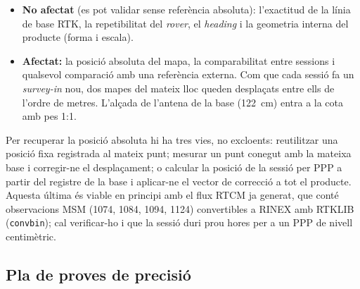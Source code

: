 \begin{itemize}
    \item \textbf{No afectat} (es pot validar sense referència absoluta): l'exactitud de la línia de base RTK, la repetibilitat del \emph{rover}, el \emph{heading} i la geometria interna del producte (forma i escala).
    \item \textbf{Afectat:} la posició absoluta del mapa, la comparabilitat entre sessions i qualsevol comparació amb una referència externa. Com que cada sessió fa un \emph{survey-in} nou, dos mapes del mateix lloc queden desplaçats entre ells de l'ordre de metres. L'alçada de l'antena de la base (122~cm) entra a la cota amb pes 1:1.
\end{itemize}

Per recuperar la posició absoluta hi ha tres vies, no excloents: reutilitzar una posició fixa registrada al mateix punt; mesurar un punt conegut amb la mateixa base i corregir-ne el desplaçament; o calcular la posició de la sessió per PPP a partir del registre de la base i aplicar-ne el vector de correcció a tot el producte. Aquesta última és viable en principi amb el flux RTCM ja generat, que conté observacions MSM (1074, 1084, 1094, 1124) convertibles a RINEX amb RTKLIB (\texttt{convbin}); cal verificar-ho i que la sessió duri prou hores per a un PPP de nivell centimètric.

\subsection{Pla de proves de precisió}
\label{subsec:pla-precisio}

